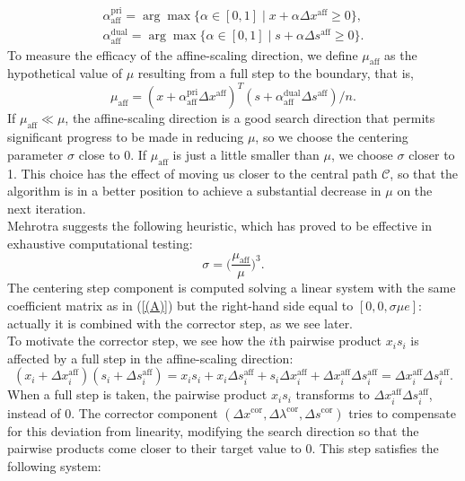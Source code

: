 \documentclass[a4paper,10 pt,titlepage,twoside]{book}
\theoremstyle{plain}
\theoremstyle{definition}
\theoremstyle{remark}
\begin{document}
\begin{align}\label{Qw}\tag{4.22a}
\alpha_{\text{aff}}^{\text{pri}}=\arg\max\{\alpha\in[0,1]\;|\;x +\alpha\Delta x^{\text{aff}}\geq 0\}, \\
\alpha_{\text{aff}}^{\text{dual}}=\arg\max\{\alpha\in[0,1]\;|\;s +\alpha\Delta s^{\text{aff}}\geq 0\}\tag{4.22b}.
\end{align}
To measure the efficacy of the affine-scaling direction, we define $\mu_{\text{aff}}$ as the hypothetical value of $\mu$ resulting from a full step to the boundary, that is,
\begin{equation}\tag{4.22c}
	\mu_{\text{aff}}= (x+\alpha_{\text{aff}}^{\text{pri}}\Delta x^{\text{aff}})^{T}(s+\alpha_{\text{aff}}^{\text{dual}}\Delta s^{\text{aff}})/n.
\end{equation}
If $\mu_{\text{aff}}\ll\mu$, the affine-scaling direction is a good search direction that permits significant progress to be made in reducing $\mu$, so we choose the centering parameter $\sigma$ close to 0. If $\mu_{\text{aff}}$ is just a little smaller than $\mu$, we choose $\sigma$ closer to 1. This choice has the effect of moving us closer  to the central path $\mathcal{C}$, so that the algorithm is in a better position to achieve a substantial decrease in $\mu$ on the next iteration.\\
Mehrotra \cite{MER} suggests the following heuristic, which has proved to be effective in exhaustive computational testing:
\begin{equation*}\label{CP}
\sigma = \bigg(\frac{\mu_{\text{aff}}}{\mu}\bigg)^{3}.
\end{equation*}
The centering step component is computed solving a linear system with the same coefficient matrix as in (\ref{(A)}) but the right-hand side equal to $[0, 0,\sigma\mu e]$: actually it is combined with the corrector step, as we see later.\\
To motivate the corrector step, we see how the $i$th pairwise product $x_{i}s_{i}$ is affected by a full step in the affine-scaling direction:
\begin{equation*}
(x_{i}+\Delta x_{i}^{\text{aff}})(s_{i}+\Delta s_{i}^{\text{aff}})= x_{i}s_{i}+ x_{i}\Delta s_{i}^{\text{aff}}+s_{i}\Delta x_{i}^{\text{aff}}+\Delta x_{i}^{\text{aff}}\Delta s_{i}^{\text{aff}} =\Delta x_{i}^{\text{aff}}\Delta s_{i}^{\text{aff}}.
\end{equation*}
When a full step is taken, the pairwise product $x_{i}s_{i}$ transforms to $\Delta x_{i}^{\text{aff}}\Delta s_{i}^{\text{aff}}$, instead of 0. The corrector component $(\Delta x^{\text{cor}}, \Delta \lambda^{\text{cor}}, \Delta s^{\text{cor}})$ tries to compensate for this deviation from linearity, modifying the search direction so that the pairwise products come closer to their target value to 0. This step satisfies the following system:
\end{document}
